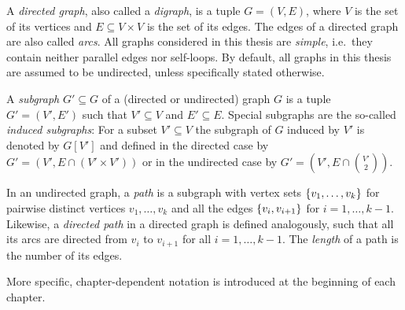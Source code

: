A \emph{directed graph}, also called a \emph{digraph}, is a tuple $G = (V, E)$, where $V$ is the set of its vertices and $E \subseteq V \times V$ is the set of its edges. The edges of a directed graph are also called \emph{arcs}.
All graphs considered in this thesis are \emph{simple}, i.e.\ they contain neither parallel edges nor self-loops. By default, all graphs in this thesis are assumed to be undirected, unless specifically stated otherwise.


A \emph{subgraph} $G' \subseteq G$ of a (directed or undirected) graph $G$ is a tuple $G' = (V', E')$ such that $V' \subseteq V$ and $E' \subseteq E$. Special subgraphs are the so-called \emph{induced subgraphs}: For a subset $V' \subseteq V$ the subgraph of $G$ induced by $V'$ is denoted by $G[V']$ and defined in the directed case by $G' = (V', E \cap (V' \times V'))$ or in the undirected case by $G' = (V', E \cap \binom{V'}{2})$. 


In an undirected graph, a \emph{path} is a subgraph with vertex sets $\{ v_1, \ldots, v_k \}$ for pairwise distinct vertices $v_1,\dots,v_k$ and all the edges $\{ v_i,v_{i+1} \}$ for $i=1,\dots,k-1$. Likewise, a \emph{directed path} in a directed graph is defined analogously, such that all its arcs are directed from $v_i$ to $v_{i+1}$ for all $i=1,\dots,k-1$. The \emph{length} of a path is the number of its edges.  

More specific, chapter-dependent notation is introduced at the beginning of each chapter.

